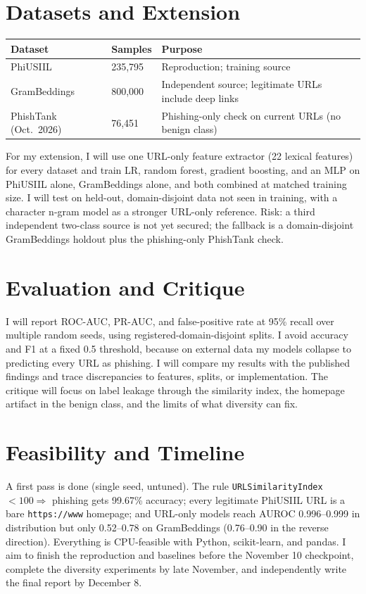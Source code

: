 \documentclass[10pt]{article}
\begin{document}
\section{Datasets and Extension}
\begin{center}
\begin{tabular}{@{}llp{4.6in}@{}}
\toprule
\textbf{Dataset} & \textbf{Samples} & \textbf{Purpose} \\
\midrule
PhiUSIIL & 235,795 & Reproduction; training source \\
GramBeddings & 800,000 & Independent source; legitimate URLs include deep links \\
PhishTank (Oct.\ 2026) & 76,451 & Phishing-only check on current URLs (no benign class) \\
\bottomrule
\end{tabular}
\end{center}
\vspace{-4pt}
For my extension, I will use one URL-only feature extractor (22 lexical features) for every dataset and train LR, random forest, gradient boosting, and an MLP on PhiUSIIL alone, GramBeddings alone, and both combined at matched training size. I will test on held-out, domain-disjoint data not seen in training, with a character n-gram model as a stronger URL-only reference. Risk: a third independent two-class source is not yet secured; the fallback is a domain-disjoint GramBeddings holdout plus the phishing-only PhishTank check.

\section{Evaluation and Critique}
I will report ROC-AUC, PR-AUC, and false-positive rate at 95\% recall over multiple random seeds, using registered-domain-disjoint splits. I avoid accuracy and F1 at a fixed 0.5 threshold, because on external data my models collapse to predicting every URL as phishing. I will compare my results with the published findings and trace discrepancies to features, splits, or implementation. The critique will focus on label leakage through the similarity index, the homepage artifact in the benign class, and the limits of what diversity can fix.

\section{Feasibility and Timeline}
A first pass is done (single seed, untuned). The rule \texttt{URLSimilarityIndex} $<100 \Rightarrow$ phishing gets 99.67\% accuracy; every legitimate PhiUSIIL URL is a bare \texttt{https://www} homepage; and URL-only models reach AUROC 0.996--0.999 in distribution but only 0.52--0.78 on GramBeddings (0.76--0.90 in the reverse direction). Everything is CPU-feasible with Python, scikit-learn, and pandas. I aim to finish the reproduction and baselines before the November 10 checkpoint, complete the diversity experiments by late November, and independently write the final report by December 8.
\end{document}
